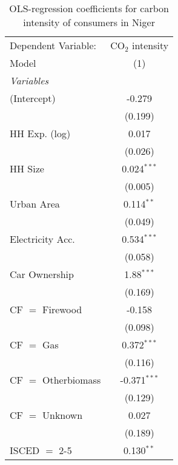 
\begin{table}[htbp!]
   \centering
   \small
   \begin{adjustbox}{width = 1\textwidth, max height = 0.95\textheight, center}
      \begin{threeparttable}[b]
         \caption{\label{tab:OLS_1_NER} OLS-regression coefficients for carbon intensity of consumers in Niger}
         \begin{tabular}{lc}
            \tabularnewline \midrule \midrule
            Dependent Variable: & CO$_{2}$ intensity\\  
            Model               & (1)\\  
            \midrule
            \emph{Variables}\\
            (Intercept)         & -0.279\\   
                                & (0.199)\\   
            HH Exp. (log)       & 0.017\\   
                                & (0.026)\\   
            HH Size             & 0.024$^{***}$\\   
                                & (0.005)\\   
            Urban Area          & 0.114$^{**}$\\   
                                & (0.049)\\   
            Electricity Acc.    & 0.534$^{***}$\\   
                                & (0.058)\\   
            Car Ownership       & 1.88$^{***}$\\   
                                & (0.169)\\   
            CF $=$ Firewood     & -0.158\\   
                                & (0.098)\\   
            CF $=$ Gas          & 0.372$^{***}$\\   
                                & (0.116)\\   
            CF $=$ Otherbiomass & -0.371$^{***}$\\   
                                & (0.129)\\   
            CF $=$ Unknown      & 0.027\\   
                                & (0.189)\\   
            ISCED $=$ 2-5       & 0.130$^{**}$\\   

\end{tabular}
\end{threeparttable}
\end{adjustbox}
\end{table}
